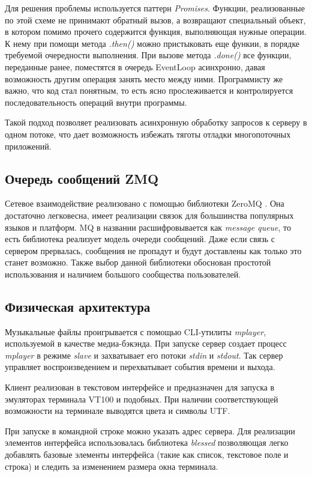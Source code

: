 Для решения проблемы используется паттерн \textit{Promises}. Функции,
реализованные по этой схеме не принимают обратный вызов, а возвращают
специальный объект, в котором помимо прочего содержится функция,
выполняющая нужные операции. К нему при помощи метода \textit{.then()}
можно пристыковать еще функии, в порядке требуемой очередности
выполнения. При вызове метода \textit{.done()} все функции, переданные
ранее, поместятся в очередь EventLoop асинхронно, давая возможность
другим операция занять место между ними. Программисту же важно, что
код стал понятным, то есть ясно прослеживается и контролируется
последовательность операций внутри программы.

Такой подход позволяет реализовать асинхронную обработку запросов к
серверу в одном потоке, что дает возможность избежать тяготы отладки
многопоточных приложений.

\subsection{ Очередь сообщений ZMQ }

Сетевое взаимодействие реализовано с помощью библиотеки ZeroMQ \cite{wiki:zmq}. Она
достаточно легковесна, имеет реализации связок для большинства
популярных языков и
платформ. MQ в названии расшифровывается как \textit{message queue},
то есть библиотека реализует модель очереди сообщений.
Даже если связь с сервером прервалась,
сообщения не пропадут и будут доставлены как только это станет
возможно. Также выбор данной библиотеки обоснован простотой
использования и наличием большого сообщества пользователей.

\subsection{ Физическая архитектура }

Музыкальные файлы проигрывается с помощью CLI-утилиты
\textit{mplayer}, используемой в качестве медиа-бэкэнда. При запуске
сервер создает процесс \textit{mplayer} в режиме \textit{slave} и
захватывает его потоки \textit{stdin} и \textit{stdout}. Так сервер
управляет воспроизведением и перехватывает события времени и выхода.

Клиент реализован в текстовом интерфейсе и предназначен для запуска в
эмуляторах терминала VT100 и подобных. При наличии соответствующей возможности на
терминале выводятся цвета и символы UTF.

При запуске в командной строке можно указать адрес сервера. Для
реализации элементов интерфейса использовалась библиотека \textit{blessed}
позволяющая легко добавлять базовые элементы интерфейса (такие как
список, текстовое поле и строка) и следить за изменением размера окна
терминала.

